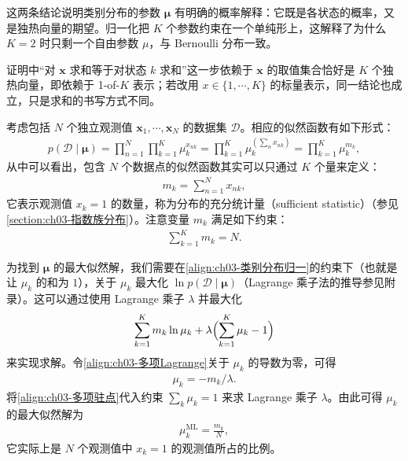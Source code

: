 \documentclass[../../main.tex]{subfiles}
\begin{document}
\begin{remark}
这两条结论说明类别分布的参数 $\boldsymbol{\mu}$ 有明确的概率解释：它既是各状态的概率，又是独热向量的期望。归一化把 $K$ 个参数约束在一个单纯形上，这解释了为什么 $K=2$ 时只剩一个自由参数 $\mu$，与 Bernoulli 分布一致。

证明中“对 $\boldsymbol{x}$ 求和等于对状态 $k$ 求和”这一步依赖于 $\boldsymbol{x}$ 的取值集合恰好是 $K$ 个独热向量，即依赖于 1-of-$K$ 表示；若改用 $x\in\{1,\cdots,K\}$ 的标量表示，同一结论也成立，只是求和的书写方式不同。
\end{remark}

考虑包括 $N$ 个独立观测值 $\boldsymbol{x}_1,\cdots,\boldsymbol{x}_N$ 的数据集 $\mathcal{D}$。相应的似然函数有如下形式：
\begin{align}
p(\mathcal{D}\mid\boldsymbol{\mu})=\prod_{n=1}^{N}\prod_{k=1}^{K}\mu_k^{x_{nk}}=\prod_{k=1}^{K}\mu_k^{\left(\sum_{n}x_{nk}\right)}=\prod_{k=1}^{K}\mu_k^{m_k},
\label{align:ch03-类别似然}
\end{align}
从中可以看出，包含 $N$ 个数据点的似然函数其实可以只通过 $K$ 个量来定义：
\begin{align}
m_k=\sum_{n=1}^{N}x_{nk},
\label{align:ch03-充分统计量}
\end{align}
它表示观测值 $x_k=1$ 的数量，称为分布的充分统计量（sufficient statistic）（参见\cref{section:ch03-指数族分布}）。注意变量 $m_k$ 满足如下约束：
\begin{align}
\sum_{k=1}^{K}m_k=N.
\label{align:ch03-多项计数约束}
\end{align}

为找到 $\boldsymbol{\mu}$ 的最大似然解，我们需要在\eqref{align:ch03-类别分布归一}的约束下（也就是让 $\mu_k$ 的和为 $1$），关于 $\mu_k$ 最大化 $\ln p(\mathcal{D}\mid\boldsymbol{\mu})$（Lagrange 乘子法的推导参见附录）。这可以通过使用 Lagrange 乘子 $\lambda$ 并最大化
\begin{align}
\sum_{k=1}^{K}m_k\ln\mu_k+\lambda\Bigl(\sum_{k=1}^{K}\mu_k-1\Bigr)
\label{align:ch03-多项Lagrange}
\end{align}
来实现求解。令\eqref{align:ch03-多项Lagrange}关于 $\mu_k$ 的导数为零，可得
\begin{align}
\mu_k=-m_k/\lambda.
\label{align:ch03-多项驻点}
\end{align}
将\eqref{align:ch03-多项驻点}代入约束 $\sum_k\mu_k=1$ 来求 Lagrange 乘子 $\lambda$。由此可得 $\mu_k$ 的最大似然解为
\begin{align}
\mu_k^{\mathrm{ML}}=\frac{m_k}{N},
\label{align:ch03-多项ML}
\end{align}
它实际上是 $N$ 个观测值中 $x_k=1$ 的观测值所占的比例。
\end{document}
